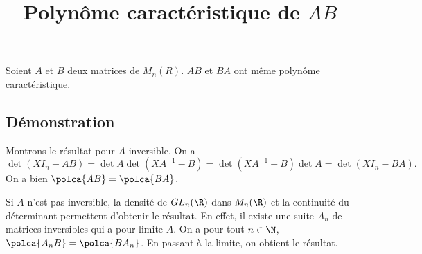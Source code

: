 \documentclass[fontsize=12pt,twoside=false,parskip=half, french]{scrartcl}
\title{Polynôme caractéristique de $AB$}
\date{}
\author{}
\begin{document}
\maketitle
   \begin{Theoreme}
      Soient $A$ et $B$ deux matrices de $M_n(R)$. $AB$ et $BA$ ont même polynôme caractéristique.  
   \end{Theoreme}
   \subsection{Démonstration}
      Montrons le résultat pour $A$ inversible. On a 
      \[
         \det(XI_n - AB) = \det A \det(XA^{-1} - B) = \det(XA^{-1} - B) \det A = \det(XI_n - BA).
      \]
      On a bien $\polca{AB} = \polca{BA}$.
      
      Si $A$ n’est pas inversible, la densité de $GL_n(\R)$ dans $M_n(\R)$ et la continuité du
      déterminant permettent d’obtenir le résultat. En effet, il existe une suite $A_n$ de matrices 
      inversibles qui a pour limite $A$. On a pour tout $n \in \N$, $\polca{A_nB} = \polca{BA_n}$.
      En passant à la limite, on obtient le résultat.
\end{document}
